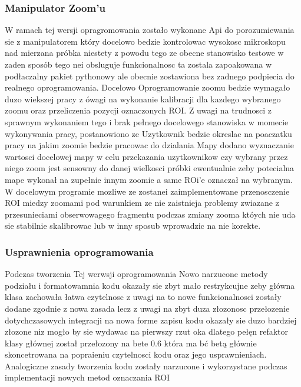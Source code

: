 \documentclass[11pt,a4paper]{article}
\begin{document}
    \subsubsection{Manipulator Zoom'u}
    \hspace{1cm} W ramach tej wersji opragromowania zostało wykonane Api do porozumiewania sie z manipulatorem który docelowo bedzie kontrolowac wysokosc mikroskopu nad mierzana próbka niestety z powodu tego ze obecne stanowisko testowe w zaden sposób tego nei obsluguje funkcionalnosc ta zostala zapoakowana w podłaczalny pakiet pythonowy ale obecnie zostawiona bez zadnego podpiecia do realnego oprogramowania. Docelowo Oprogramowanie zoomu bedzie wymagało duzo wiekszej pracy z ówagi na wykonanie kalibracji dla kazdego wybranego zoomu oraz przeliczenia pozycji oznaczonych ROI. Z uwagi na trudnosci z sprawnym wykonaniem tego i brak pełnego docelowego stanowiska w momecie wykonywania pracy, postanowiono ze Uzytkownik bedzie okreslac na poaczatku pracy na jakim zoomie bedzie pracowac do dzialania Mapy dodano wyznaczanie wartosci docelowej mapy w celu przekazania uzytkownikow czy wybrany przez niego zoom jest sensowny do danej wielkosci próbki ewentualnie zeby potecialna mape wykonał na zupełnie innym zoomie a same ROi'e oznaczał na wybranym. W docelowym programie mozliwe ze zostanei zaimplementowane przenosczenie ROI miedzy zoomami pod warunkiem ze nie zaistnieja problemy zwiazane z przesunieciami obserwowagego fragmentu podczas zmiany zooma któych nie uda sie stabilnie skalibrowac lub w inny sposub wprowadzic na nie korekte.

    \subsubsection{Usprawnienia oprogramowania}
    \hspace{1cm} Podczas tworzenia Tej werwsji oprogramowania Nowo narzucone metody podziału i formatowamnia kodu okazały sie zbyt mało restrykcujne zeby główna klasa zachowała łatwa czytelnosc z uwagi na to nowe funkcionalnosci zostały dodane zgodnie z nowa zasada lecz z uwagi na zbyt duza złozonosc przełozenie dotychczasowych integracji na nowa forme zapisu kodu okazały sie duzo bardziej złozone niz mogło by sie wydawac na pierwszy rzut oka dlatego pełęn refaktor klasy głównej został przełozony na bete 0.6 która ma bć betą głównie skoncetrowana na popraieniu czytelnosci kodu oraz jego usprawnieniach.
    \hspace{1cm} Analogiczne zasady tworzenia kodu zostały narzucone i wykorzystane podczas implementacji nowych metod oznaczania ROI
\end{document}
